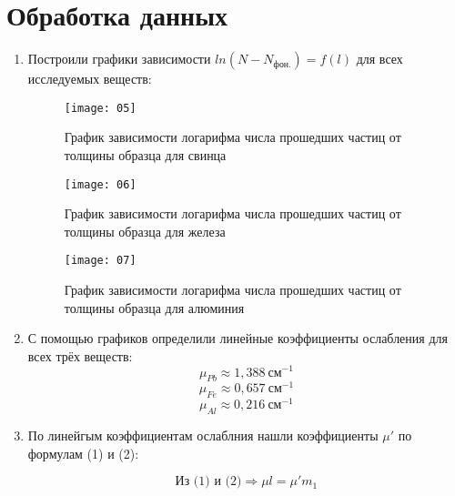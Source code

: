 \documentclass[letterpaper,12pt]{article}
\begin{document}
		\section{Обработка данных}
				\begin{enumerate}
			\item Построили графики зависимости $ln(N-N_\text{фон.}) = f(l)$ для всех исследуемых веществ:
			
			
		\begin{figure} [h!]
		\begin{minipage}[h]{0.45\textwidth}
			\centering
			\texttt{[image: 05]}
			\caption{График зависимости логарифма числа прошедших частиц от толщины образца для свинца}
		\end{minipage}
		\hfill
		\begin{minipage}[h]{0.45\textwidth}
			\centering
			\texttt{[image: 06]}
			\caption{График зависимости логарифма числа прошедших частиц от толщины образца для железа}
		\end{minipage}
	\end{figure}
		
		
		
		\begin{figure} [h!]
			\centering
			{\texttt{[image: 07]}}
			\caption{График зависимости логарифма числа прошедших частиц от толщины образца для алюминия}
		\end{figure}
		
		\item 
		С помощью графиков определили линейные коэффициенты ослабления для всех трёх веществ:
		 \begin{equation}
		 \mu_{Pb}\approx1,388 ~\text{см}^{-1}
		 \end{equation}
		\begin{equation}
		\mu_{Fe}\approx0,657 ~\text{см}^{-1}
		\end{equation}
		\begin{equation}
		\mu_{Al}\approx0,216 ~\text{см}^{-1}
		\end{equation}
		
		\item 
		 По линейгым коэффициентам ослаблния нашли коэффициенты  $\mu'$  по формулам (1) и (2):
		 
		 \begin{equation}
		 \text{Из (1) и (2)} \Rightarrow \mu l = \mu' m_1
		 \end{equation}
		

\end{enumerate}
\end{document}
